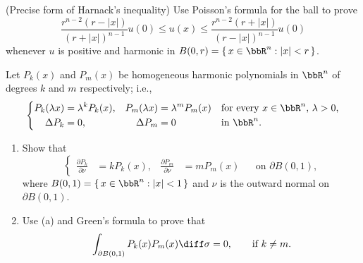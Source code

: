 \begin{problem}
  (Precise form of Harnack's inequality) Use Poisson's formula for the ball
  to prove
  \[
    \frac{r^{n-2}(r-|x|)}{(r+|x|)^{n-1}}u(0)%
    \leq u(x)%
    \leq \frac{r^{n-2}(r+|x|)}{(r-|x|)^{n-1}}u(0)
  \]
  whenever \(u\) is positive and harmonic in
  \(B(0,r)=\{\,x\in\bbR^n:|x|<r\,\}\).
\end{problem}
\begin{solution}

\end{solution}
\newpage

\begin{problem}
  Let \(P_k(x)\) and \(P_m(x)\) be homogeneous harmonic polynomials in
  \(\bbR^n\) of degrees \(k\) and \(m\) respectively; i.e.,
  \[
    \left\{%
      \begin{aligned}
        P_k(\lambda x)&=\lambda^k P_k(x),&P_m(\lambda x)&=\lambda^m P_m(x)
        &&\text{for every \(x\in\bbR^n\), \(\lambda>0\),}\\
        \Delta P_k&=0,&\Delta P_m&=0&&\text{in \(\bbR^n\).}
      \end{aligned}
    \right.
  \]
  \begin{enumerate}[label=(\alph*),noitemsep]
  \item Show that
    \[
      \left\{%
        \begin{aligned}
          \frac{\partial P_k}{\partial \nu}&=kP_k(x),& \frac{\partial
            P_m}{\partial\nu}&=mP_m(x)&&\text{on \(\partial B(0,1)\),}
        \end{aligned}
      \right.
    \]
    where \(B(0,1)=\{\,x\in\bbR^n:|x|<1\,\}\) and \(\nu\) is the outward
    normal on \(\partial B(0,1)\).
  \item Use (a) and Green's formula to prove that
    \[
      \int_{\partial B(0,1)}P_k(x)P_m(x)\diff\sigma=0,\qquad\text{if
        \(k\neq m\).}
    \]
  \end{enumerate}
\end{problem}
\begin{solution}
\end{solution}

